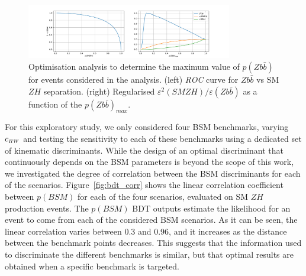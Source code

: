 \begin{figure}
\centering
\includegraphics[width=0.8\textwidth]{plots/bkg_cut_opt.pdf}
\caption{
\label{fig:s2_over_b}
Optimisation analysis to determine the maximum value of $p(Z b\bar{b})$ for events
considered in the analysis. (left) {\it ROC} curve for $Z b\bar{b}$ vs SM $Z H$
separation. (right) Regularised $\varepsilon^2(SM Z H) /
\varepsilon(Zb\bar{b})$ as a function of the $p(Z b\bar{b})_{max}$.
}
\end{figure}

For this exploratory study, we only considered four BSM benchmarks, varying $c_{\scriptscriptstyle HW}$ and testing the
sensitivity to each of these benchmarks using a dedicated set of kinematic
discriminants. While the design of an optimal discriminant that continuously depends on
the BSM parameters is beyond the scope of this work, we investigated the degree of
correlation between the BSM discriminants for each of the scenarios.
Figure~\ref{fig:bdt_corr} shows the linear correlation coefficient between $p(BSM)$ for
each of the four scenarios, evaluated on SM $Z H$ production events. The $p(BSM)$
BDT outputs estimate the likelihood for an event to come from each of the considered BSM
scenarios.
As it can be seen,
the linear correlation varies between 0.3 and 0.96, and it increases as the distance
between the benchmark points decreases. This suggests that the information used to
discriminate the different benchmarks is similar, but that optimal results are obtained
when a specific benchmark is targeted.

%

